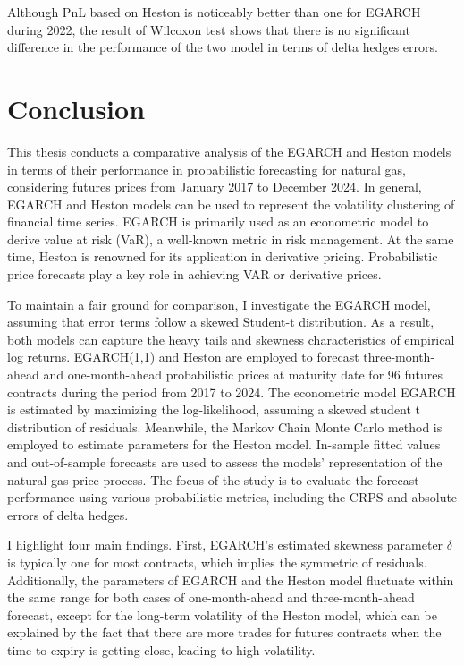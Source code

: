 \documentclass[12pt,a4paper]{article}
\numberwithin{equation}{section}
\begin{document}
Although PnL based on Heston is noticeably better than one for EGARCH during 2022, the result of Wilcoxon test shows that there is no significant difference in the performance of the two model in terms of delta hedges errors.


\newpage
\section{Conclusion}

This thesis conducts a comparative analysis of the EGARCH and Heston models in terms of their performance in probabilistic forecasting for natural gas, considering futures prices from January 2017 to December 2024. In general, EGARCH and Heston models can be used to represent the volatility clustering of financial time series. EGARCH is primarily used as an econometric model to derive value at risk (VaR), a well-known metric in risk management. At the same time, Heston is renowned for its application in derivative pricing. Probabilistic price forecasts play a key role in achieving VAR or derivative prices.

To maintain a fair ground for comparison, I investigate the EGARCH model, assuming that error terms follow a skewed Student-t distribution. As a result, both models can capture the heavy tails and skewness characteristics of empirical log returns. EGARCH(1,1) and Heston are employed to forecast three-month-ahead and one-month-ahead probabilistic prices at maturity date for 96 futures contracts during the period from 2017 to 2024. The econometric model EGARCH is estimated by maximizing the log-likelihood, assuming a skewed student t distribution of residuals. Meanwhile, the Markov Chain Monte Carlo method is employed to estimate parameters for the Heston model. In-sample fitted values and out-of-sample forecasts are used to assess the models' representation of the natural gas price process. The focus of the study is to evaluate the forecast performance using various probabilistic metrics, including the CRPS and absolute errors of delta hedges.

I highlight four main findings. First, EGARCH's estimated skewness parameter $\delta$ is typically one for most contracts, which implies the symmetric of residuals. Additionally, the parameters of EGARCH and the Heston model fluctuate within the same range for both cases of one-month-ahead and three-month-ahead forecast, except for the long-term volatility of the Heston model, which can be explained by the fact that there are more trades for futures contracts when the time to expiry is getting close, leading to high volatility.
\end{document}
